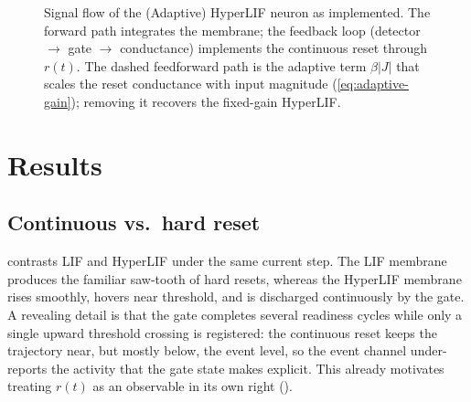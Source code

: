 \documentclass[11pt]{article}
\newcommand{\teff}{\theta_{\mathrm{eff}}}
\newcommand{\rinf}{r_{\infty}}
\begin{document}
\begin{figure}[t]
  \centering
  \caption{Signal flow of the (Adaptive) HyperLIF neuron as implemented. The
  forward path integrates the membrane; the feedback loop
  (detector $\to$ gate $\to$ conductance) implements the continuous reset through
  $r(t)$. The dashed feedforward path is the adaptive term $\beta|J|$ that scales
  the reset conductance with input magnitude (\cref{eq:adaptive-gain}); removing
  it recovers the fixed-gain HyperLIF.}
  \label{fig:schematic}
\end{figure}

\section{Results}\label{sec:results}

\subsection{Continuous vs.\ hard reset}\label{sec:results-step}
 contrasts LIF and HyperLIF under the same current step. The LIF
membrane produces the familiar saw-tooth of hard resets, whereas the HyperLIF
membrane rises smoothly, hovers near threshold, and is discharged continuously
by the gate. A revealing detail is that the gate completes several
readiness cycles while only a single upward threshold crossing is registered:
the continuous reset keeps the trajectory near, but mostly below, the event
level, so the event channel under-reports the activity that the gate state makes
explicit. This already motivates treating $r(t)$ as an observable in its own
right ().
\end{document}
